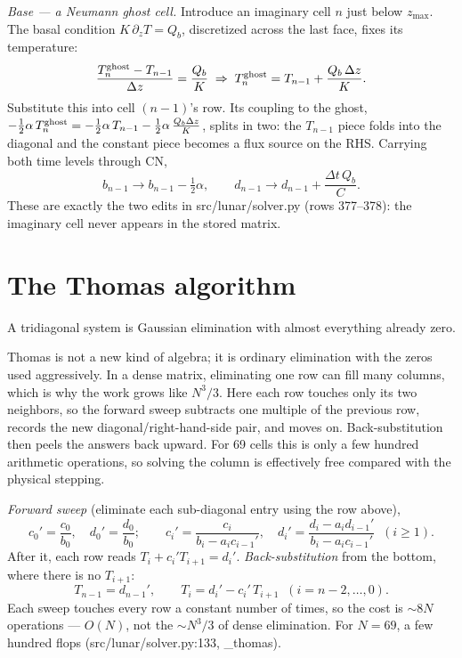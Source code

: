 \documentclass[11pt]{report}
\newcommand{\code}[1]{{\ttfamily\small #1}}
\begin{document}
\emph{Base --- a Neumann ghost cell.} Introduce an imaginary cell $n$ just below
$z_{\max}$. The basal condition $K\,\partial_z T=Q_b$, discretized across the last
face, fixes its temperature:
\[
\frac{T_n^{\rm ghost}-T_{n-1}}{\Delta z}=\frac{Q_b}{K}
\;\Rightarrow\;
T_n^{\rm ghost}=T_{n-1}+\frac{Q_b\,\Delta z}{K}.
\]
Substitute this into cell $(n{-}1)$'s row. Its coupling to the ghost,
$-\tfrac12\alpha\,T_n^{\rm ghost}=-\tfrac12\alpha\,T_{n-1}-\tfrac12\alpha\,
\tfrac{Q_b\Delta z}{K}$, splits in two: the $T_{n-1}$ piece folds into the
diagonal and the constant piece becomes a flux source on the RHS. Carrying both
time levels through CN,
\[
\boxed{\;b_{n-1}\to b_{n-1}-\tfrac12\alpha,\qquad
d_{n-1}\to d_{n-1}+\frac{\Delta t\,Q_b}{C}.\;}
\]
These are exactly the two edits in \code{src/lunar/solver.py} (rows 377--378):
the imaginary cell never appears in the stored matrix.

\section{The Thomas algorithm}\label{app:thomas}
A tridiagonal system is Gaussian elimination with almost everything already zero.

\begin{plain}
Thomas is not a new kind of algebra; it is ordinary elimination with the zeros
used aggressively. In a dense matrix, eliminating one row can fill many columns,
which is why the work grows like $N^3/3$. Here each row touches only its two
neighbors, so the forward sweep subtracts one multiple of the previous row,
records the new diagonal/right-hand-side pair, and moves on. Back-substitution
then peels the answers back upward. For 69 cells this is only a few hundred
arithmetic operations, so solving the column is effectively free compared with
the physical stepping.
\end{plain}

\emph{Forward sweep} (eliminate each sub-diagonal entry using the row above),
\[
c_0'=\frac{c_0}{b_0},\quad d_0'=\frac{d_0}{b_0};\qquad
c_i'=\frac{c_i}{b_i-a_i c_{i-1}'},\quad
d_i'=\frac{d_i-a_i d_{i-1}'}{b_i-a_i c_{i-1}'}\;\;(i\ge1).
\]
After it, each row reads $T_i+c_i' T_{i+1}=d_i'$. \emph{Back-substitution} from
the bottom, where there is no $T_{i+1}$:
\[
T_{n-1}=d_{n-1}',\qquad T_i=d_i'-c_i'\,T_{i+1}\;\;(i=n{-}2,\dots,0).
\]
Each sweep touches every row a constant number of times, so the cost is
$\sim$$8N$ operations --- $O(N)$, not the $\sim N^3/3$ of dense elimination. For
$N=69$, a few hundred flops (\code{src/lunar/solver.py:133}, \code{\_thomas}).
\end{document}
